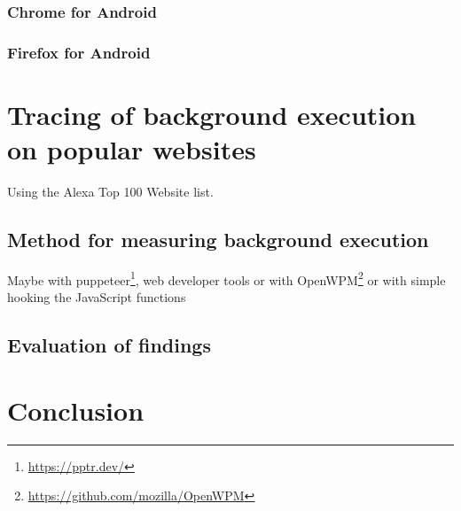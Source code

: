 \documentclass[article,type=bsc,colorback,accentcolor=tud9c]{tudthesis}
\begin{document}
  \subsubsection{Chrome for Android}

  \subsubsection{Firefox for Android}

  \newpage
  \section{Tracing of background execution on popular websites}

  Using the Alexa Top 100 Website list.
  
  \subsection{Method for measuring background execution}

  Maybe with puppeteer\footnote{\url{https://pptr.dev/}}, web developer tools or with OpenWPM\footnote{\url{https://github.com/mozilla/OpenWPM}} or with simple hooking the JavaScript functions
  
  \subsection{Evaluation of findings}

  
  \newpage
  \section{Conclusion}

  

  

   
\end{document}
